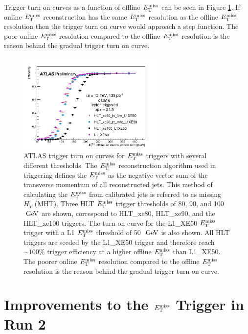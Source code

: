 \indent Trigger turn on curves as a function of offline $\met$ can be seen in Figure \ref{fig:trigTurnON}.  If online $\met$ reconstruction has the same $\met$ resolution as the offline $\met$ resolution then the trigger turn on curve would approach a step function.  The poor online $\met$ resolution compared to the offline $\met$ resolution is the reason behind the gradual trigger turn on curve. \\

\begin{figure}[h!]
  \begin{center}
    \includegraphics[width=0.65\textwidth]{figures/trigger/2016-05-16-UpdatedTurnOns.png}\hspace{0.05\textwidth}
\end{center}
\caption[ATLAS trigger turn on curves for $\met$ triggers with several different thresholds.]{ATLAS trigger turn on curves for $\met$ triggers with several different thresholds.\cite{Trigger2016} The $\met$ reconstruction algorithm used in triggering defines the $\met$ as the negative vector sum of the transverse momentum of all reconstructed jets. This method of calculating the $\met$ from calibrated jets is referred to as missing $H_T$ (MHT).  Three HLT $\met$ trigger thresholds of 80, 90, and 100 $\gev$ are shown, correspond to {\sc HLT\_xe80}, {\sc HLT\_xe90}, and the {\sc HLT\_xe100} triggers.  The turn on curve for the {\sc L1\_XE50} $\met$ trigger with a L1 $\met$ threshold of 50 $\gev$ is also shown.  All HLT triggers are seeded by the {\sc L1\_XE50} trigger and therefore reach $\sim100$\% trigger efficiency at a higher offline $\met$ than {\sc L1\_XE50}. The poorer online $\met$ resolution compared to the offline $\met$ resolution is the reason behind the gradual trigger turn on curve. }
\label{fig:trigTurnON} 
\end{figure}

\section{Improvements to the $\met$ Trigger in Run 2}
\label{sec:trig:improvements}

